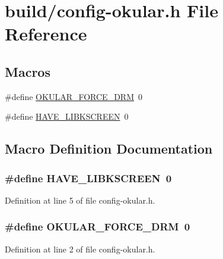 \hypertarget{config-okular_8h}{\section{build/config-\/okular.h File Reference}
\label{config-okular_8h}
}
\subsection*{Macros}
\begin{DoxyCompactItemize}
\item 
\#define \hyperlink{config-okular_8h_a18f1b361b6827012fa523f41c32a0dbe}{O\+K\+U\+L\+A\+R\+\_\+\+F\+O\+R\+C\+E\+\_\+\+D\+R\+M}~0
\item 
\#define \hyperlink{config-okular_8h_a134d681cfedb9b13de9edc06eb84962f}{H\+A\+V\+E\+\_\+\+L\+I\+B\+K\+S\+C\+R\+E\+E\+N}~0
\end{DoxyCompactItemize}


\subsection{Macro Definition Documentation}
\hypertarget{config-okular_8h_a134d681cfedb9b13de9edc06eb84962f}{
\subsubsection[{H\+A\+V\+E\+\_\+\+L\+I\+B\+K\+S\+C\+R\+E\+E\+N}]{\setlength{\rightskip}{0pt plus 5cm}\#define H\+A\+V\+E\+\_\+\+L\+I\+B\+K\+S\+C\+R\+E\+E\+N~0}}\label{config-okular_8h_a134d681cfedb9b13de9edc06eb84962f}


Definition at line 5 of file config-\/okular.\+h.

\hypertarget{config-okular_8h_a18f1b361b6827012fa523f41c32a0dbe}{
\subsubsection[{O\+K\+U\+L\+A\+R\+\_\+\+F\+O\+R\+C\+E\+\_\+\+D\+R\+M}]{\setlength{\rightskip}{0pt plus 5cm}\#define O\+K\+U\+L\+A\+R\+\_\+\+F\+O\+R\+C\+E\+\_\+\+D\+R\+M~0}}\label{config-okular_8h_a18f1b361b6827012fa523f41c32a0dbe}


Definition at line 2 of file config-\/okular.\+h.

